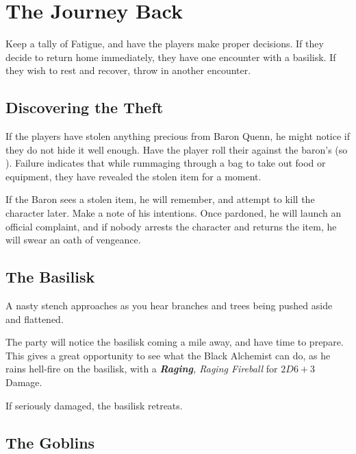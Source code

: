 \section{The Journey Back}
\label{siege}

\begin{multicols}{2}

\noindent
Keep a tally of Fatigue, and have the players make proper decisions.
If they decide to return home immediately, they have one encounter with a basilisk.
If they wish to rest and recover, throw in another encounter.

\subsection{Discovering the Theft}

If the players have stolen anything precious from Baron Quenn, he might notice if they do not hide it well enough.
Have the player roll their  against the baron's  (so \tn).
Failure indicates that while rummaging through a bag to take out food or equipment, they have revealed the stolen item for a moment.

If the Baron sees a stolen item, he will remember, and attempt to kill the character later.
Make a note of his intentions.
Once pardoned, he will launch an official complaint, and if nobody arrests the character and returns the item, he will swear an oath of vengeance.

\subsection{The Basilisk}

\begin{boxtext}

  A nasty stench approaches as you hear branches and trees being pushed aside and flattened.

\end{boxtext}

The party will notice the basilisk coming a mile away, and have time to prepare.
This gives a great opportunity to see what the Black Alchemist can do, as he rains hell-fire on the basilisk, with a \textit{\textbf{Raging}, Raging Fireball} for $2D6+3$ Damage.

\basilisk

If seriously damaged, the basilisk retreats.

\subsection{The Goblins}


\end{multicols}
